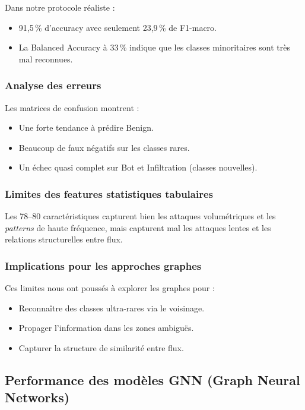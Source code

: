 ﻿\documentclass[11pt,a4paper]{article}
\begin{document}
Dans notre protocole réaliste :
\begin{itemize}
    \item 91,5\,\% d'accuracy avec seulement 23,9\,\% de F1-macro.
    \item La Balanced Accuracy à 33\,\% indique que les classes minoritaires sont très mal reconnues.
\end{itemize}

\subsubsection{Analyse des erreurs}

Les matrices de confusion montrent :
\begin{itemize}
    \item Une forte tendance à prédire Benign.
    \item Beaucoup de faux négatifs sur les classes rares.
    \item Un échec quasi complet sur Bot et Infiltration (classes nouvelles).
\end{itemize}

\subsubsection{Limites des features statistiques tabulaires}

Les 78--80 caractéristiques capturent bien les attaques volumétriques et les \emph{patterns} de haute fréquence, mais capturent mal les attaques lentes et les relations structurelles entre flux.

\subsubsection{Implications pour les approches graphes}

Ces limites nous ont poussés à explorer les graphes pour :
\begin{itemize}
    \item Reconnaître des classes ultra-rares via le voisinage.
    \item Propager l'information dans les zones ambiguës.
    \item Capturer la structure de similarité entre flux.
\end{itemize}

\subsection{Performance des modèles GNN (Graph Neural Networks)}
\label{subsec:resultats_gnn}
\end{document}
